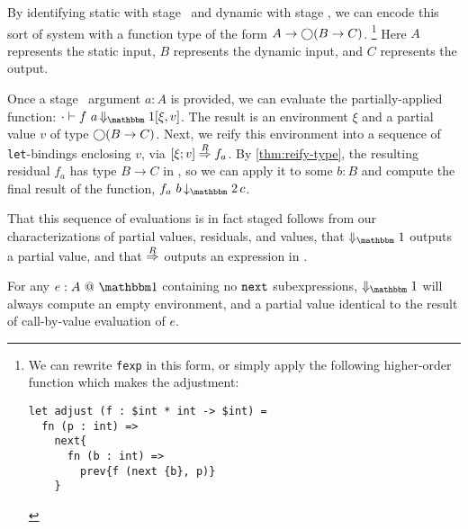 By identifying static with stage \bbone\ and dynamic with stage \bbtwo, 
we can encode this sort of system with a function type of the form $A\to\bigcirc(B\to C)$.
\cprotect\footnote{We can rewrite \texttt{fexp} in this form, or simply apply
the following higher-order function which makes the adjustment:
\begin{lstlisting} 
let adjust (f : $int * int -> $int) =
  fn (p : int) => 
    next{
      fn (b : int) => 
        prev{f (next {b}, p)}
    }
\end{lstlisting}}
%
Here $A$ represents the static input, $B$ represents the dynamic input, and $C$ represents the output.

Once a stage \bbone\ argument $a:A$ is provided, we can evaluate the partially-applied
function:
$\cdot\vdash f~a \mathop{\redonesym} [\xi,v]$.
The result is an environment $\xi$ and a partial value $v$ of type $\bigcirc(B\to
C)$. Next, we reify this environment into a sequence of \verb|let|-bindings
enclosing $v$, via $[{\xi};{v}]\overset{R}\Rightarrow{f_a}$. By \ref{thm:reify-type}, the resulting
residual $f_a$ has type $B\to C$ in \langTwo, so we can apply it to some $b:B$
and compute the final result of the function, $f_a~b \mathop{\tworedsym} c$.

That this sequence of evaluations is in fact staged follows from our
characterizations of partial values, residuals, and values, that $\redonesym$
outputs a partial value, and that $\overset{R}\Rightarrow$ outputs an expression in \langTwo.

\begin{remark}
For any $\colone{e}{A}$ containing no ${\tt next}$ subexpressions, $\redonesym$ will
always compute an empty environment, and a partial value identical to the result
of call-by-value evaluation of $e$.
\end{remark}


